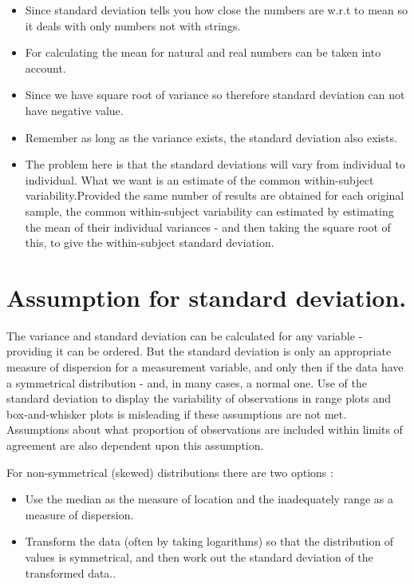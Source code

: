 \documentclass{article}
\begin{document}
\begin{itemize}
  \item Since standard deviation tells you how close the numbers are w.r.t to mean so it deals with only numbers not with strings.	
  \item For calculating the mean for natural and real numbers can be taken into account.
  \item Since we have square root of variance so therefore standard deviation can not have negative value.
  \item Remember as long as the variance exists, the standard deviation also exists.
  \item The problem here is that the standard deviations will vary from individual to individual. What we want is an estimate of the common within-subject variability.Provided the same number of results are obtained for each original sample, the common within-subject variability can estimated by estimating the mean of their individual variances - and then taking the square root of this, to give the within-subject standard deviation.
\end{itemize}

\section{Assumption for standard deviation.}

The variance and standard deviation can be calculated for any variable - providing it can be ordered. But the standard deviation is only an appropriate measure of dispersion for a measurement variable, and only then if the data have a symmetrical distribution - and, in many cases, a normal one. Use of the standard deviation to display the variability of observations in range plots and box-and-whisker plots is misleading if these assumptions are not met. Assumptions about what proportion of observations are included within limits of agreement are also dependent upon this assumption.

For non-symmetrical (skewed) distributions there are two options :
\begin{itemize}
  \item Use the median as the measure of location and the inadequately range as a measure of dispersion.	
  \item Transform the data (often by taking logarithms) so that the distribution of values is symmetrical, and then work out the standard deviation of the transformed data..
\end{itemize}
\end{document}
